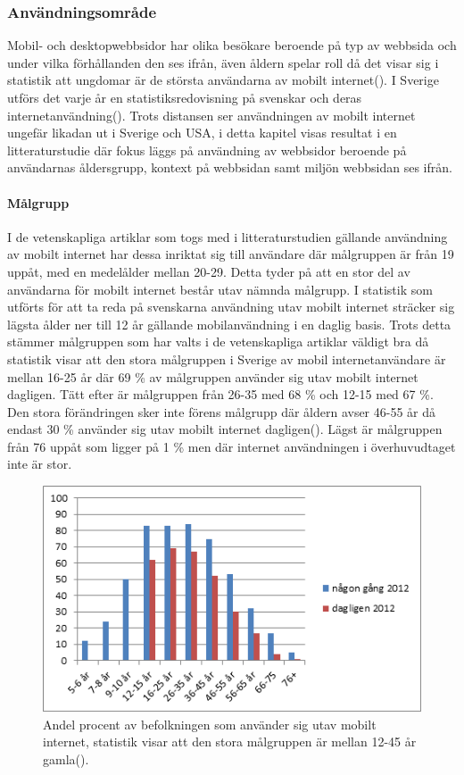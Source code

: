 \documentclass[11pt]{article}
\begin{document}
\subsubsection{Användningsområde}

Mobil- och desktopwebbsidor har olika besökare beroende på typ av webbsida och under vilka förhållanden den ses ifrån, även åldern spelar roll då det visar sig i statistik att ungdomar är de största användarna av mobilt internet(\cite[s.24]{.se}). I Sverige utförs det varje år en statistiksredovisning på svenskar och deras internetanvändning(\cite{.se}). Trots distansen ser användningen av mobilt internet ungefär likadan ut i Sverige och USA, i detta kapitel visas resultat i en litteraturstudie där fokus läggs på användning av webbsidor beroende på användarnas åldersgrupp, kontext på webbsidan samt miljön webbsidan ses ifrån.

\paragraph{Målgrupp}\mbox{}

I de vetenskapliga artiklar som togs med i litteraturstudien gällande användning av mobilt internet har dessa inriktat sig till användare där målgruppen är från 19 uppåt, med en medelålder mellan 20-29. Detta tyder på att en stor del av användarna för mobilt internet består utav nämnda målgrupp. I statistik som utförts för att ta reda på svenskarna användning utav mobilt internet sträcker sig lägsta ålder ner till 12 år gällande mobilanvändning i en daglig basis. Trots detta stämmer målgruppen som har valts i de vetenskapliga artiklar väldigt bra då statistik visar att den stora målgruppen i Sverige av mobil internetanvändare är mellan 16-25 år där 69 \% av målgruppen använder sig utav mobilt internet dagligen. Tätt efter är målgruppen från 26-35 med 68 \% och 12-15 med 67 \%. Den stora förändringen sker inte förens målgrupp där åldern avser 46-55 år då endast 30 \% använder sig utav mobilt internet dagligen(\cite[s. 24]{.se}). Lägst är målgruppen från 76 uppåt som ligger på 1 \% men där internet användningen i överhuvudtaget inte är stor.
\\
\setcounter{figure}{3}
\begin{figure}[H]
  \centering
    \includegraphics[scale=0.8]{pics/statistikalder.png}
    \caption{Andel procent av befolkningen som använder sig utav mobilt internet, statistik visar att den stora målgruppen är mellan 12-45 år gamla(\cite[s. 24]{.se}).}
\end{figure}
\end{document}
